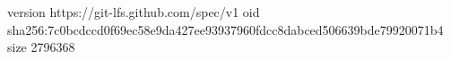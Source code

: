 version https://git-lfs.github.com/spec/v1
oid sha256:7c0bcdccd0f69ec58e9da427ee93937960fdcc8dabced506639bde79920071b4
size 2796368
